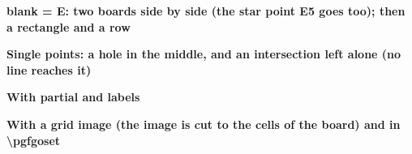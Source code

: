 \documentclass{article}
\newcommand\case[1]{\par\medskip\noindent\textbf{#1}\par\nopagebreak}
\begin{document}
\case{blank = E: two boards side by side (the star point E5 goes too); then a rectangle and a row}
\begin{goban}[9, blank = E]
\end{goban}
\begin{goban}[9, blank = {A9:C7, 5}]
\end{goban}

\case{Single points: a hole in the middle, and an intersection left alone (no line reaches it)}
\begin{goban}[9, blank = {E5, A2, B1}]
\end{goban}

\case{With partial and labels}
\begin{goban}[9, blank = {D, 6}, partial = A1:G8, label]
\end{goban}

\case{With a grid image (the image is cut to the cells of the board) and in \textbackslash pgfgoset}
\begin{goban}[9, blank = E, grid = {image = {file = pgfgo-grid.png}}]
\end{goban}
\begin{goban}[9]
\end{goban}
\end{document}
